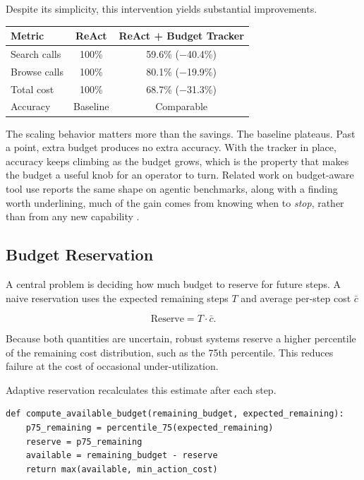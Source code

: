 Despite its simplicity, this intervention yields substantial improvements.

\begin{center}
\begin{tabular}{lcc}
\toprule
Metric & ReAct & ReAct + Budget Tracker \\
\midrule
Search calls & 100\% & 59.6\% ($-$40.4\%) \\
Browse calls & 100\% & 80.1\% ($-$19.9\%) \\
Total cost & 100\% & 68.7\% ($-$31.3\%) \\
Accuracy & Baseline & Comparable \\
\bottomrule
\end{tabular}
\end{center}

The scaling behavior matters more than the savings. The baseline plateaus. Past a point, extra budget produces no extra accuracy. With the tracker in place, accuracy keeps climbing as the budget grows, which is the property that makes the budget a useful knob for an operator to turn. Related work on budget-aware tool use reports the same shape on agentic benchmarks, along with a finding worth underlining, much of the gain comes from knowing when to \emph{stop}, rather than from any new capability \cite{budgettooluse2026}.

\subsection{Budget Reservation}

A central problem is deciding how much budget to reserve for future steps. A naive reservation uses the expected remaining steps $T$ and average per-step cost $\bar{c}$

\[
\text{Reserve} = T \cdot \bar{c}.
\]

Because both quantities are uncertain, robust systems reserve a higher percentile of the remaining cost distribution, such as the 75th percentile. This reduces failure at the cost of occasional under-utilization.

Adaptive reservation recalculates this estimate after each step. {\footnotesize
\begin{verbatim}
def compute_available_budget(remaining_budget, expected_remaining):
    p75_remaining = percentile_75(expected_remaining)
    reserve = p75_remaining
    available = remaining_budget - reserve
    return max(available, min_action_cost)
\end{verbatim}
}

